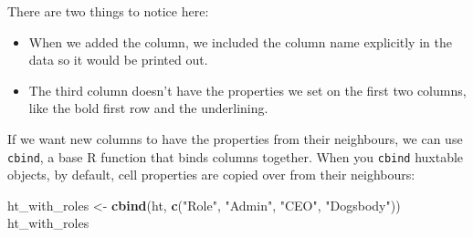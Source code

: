 \documentclass[]{article}
\newenvironment{Shaded}{\begin{snugshade}}{\end{snugshade}}
\newcommand{\KeywordTok}[1]{\textcolor[rgb]{0.13,0.29,0.53}{\textbf{#1}}}
\newcommand{\StringTok}[1]{\textcolor[rgb]{0.31,0.60,0.02}{#1}}
\newcommand{\NormalTok}[1]{#1}
\providecommand{\tightlist}{%
  \setlength{\itemsep}{0pt}\setlength{\parskip}{0pt}}
\begin{document}
\FloatBarrier

There are two things to notice here:

\begin{itemize}
\tightlist
\item
  When we added the column, we included the column name explicitly in
  the data so it would be printed out.
\item
  The third column doesn't have the properties we set on the first two
  columns, like the bold first row and the underlining.
\end{itemize}

If we want new columns to have the properties from their neighbours, we
can use \texttt{cbind}, a base R function that binds columns together.
When you \texttt{cbind} huxtable objects, by default, cell properties
are copied over from their neighbours:

\begin{Shaded}
\begin{Highlighting}[]
\NormalTok{ht_with_roles <-}\StringTok{ }\KeywordTok{cbind}\NormalTok{(ht, }\KeywordTok{c}\NormalTok{(}\StringTok{"Role"}\NormalTok{, }\StringTok{"Admin"}\NormalTok{, }\StringTok{"CEO"}\NormalTok{, }\StringTok{"Dogsbody"}\NormalTok{))}
\NormalTok{ht_with_roles}
\end{Highlighting}
\end{Shaded}
\end{document}
